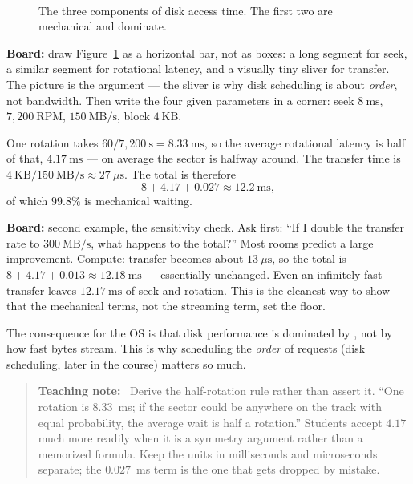 \documentclass[11pt]{article}
\newenvironment{teachingaside}{\begin{quote}\small\color{primary-gold}\textbf{Teaching note:}\ }{\end{quote}}
\begin{document}
\begin{figure}[ht]
\centering
\small
{}\hfill
{}\hfill
{}\\[0.3em]
\caption{The three components of disk access time. The first two are mechanical
and dominate.}
\label{fig:disk-time}
\end{figure}

\textbf{Board:} draw Figure~\ref{fig:disk-time} as a horizontal bar, not as
boxes: a long segment for seek, a similar segment for rotational latency, and a
visually tiny sliver for transfer. The picture is the argument --- the sliver is
why disk scheduling is about \emph{order}, not bandwidth. Then write the four
given parameters in a corner: seek $8\ \text{ms}$, $7{,}200\ \text{RPM}$,
$150\ \text{MB/s}$, block $4\ \text{KB}$.

One rotation takes $60/7{,}200\ \text{s} = 8.33\ \text{ms}$, so the average
rotational latency is half of that, $4.17\ \text{ms}$ --- on average the sector is
halfway around. The transfer time is $4\ \text{KB} / 150\ \text{MB/s} \approx
27\ \mu\text{s}$. The total is therefore
\[
8 + 4.17 + 0.027 \approx 12.2\ \text{ms},
\]
of which $99.8\%$ is mechanical waiting.

\textbf{Board:} second example, the sensitivity check. Ask first: ``If I double
the transfer rate to $300\ \text{MB/s}$, what happens to the total?'' Most rooms
predict a large improvement. Compute: transfer becomes about $13\ \mu\text{s}$,
so the total is $8 + 4.17 + 0.013 \approx 12.18\ \text{ms}$ --- essentially
unchanged. Even an infinitely fast transfer leaves $12.17\ \text{ms}$ of seek and
rotation. This is the cleanest way to show that the mechanical terms, not the
streaming term, set the floor.

The consequence for the OS is that disk performance is dominated by , not by how fast bytes stream. This is why scheduling the
\emph{order} of requests (disk scheduling, later in the course) matters so much.

\begin{teachingaside}
Derive the half-rotation rule rather than assert it. ``One rotation is 8.33~ms;
if the sector could be anywhere on the track with equal probability, the average
wait is half a rotation.'' Students accept $4.17$ much more readily when it is a
symmetry argument rather than a memorized formula. Keep the units in
milliseconds and microseconds separate; the $0.027$~ms term is the one that
gets dropped by mistake.
\end{teachingaside}
\end{document}
